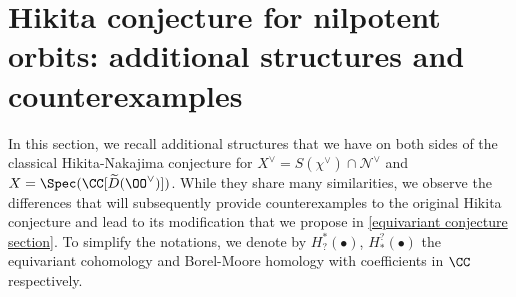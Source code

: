 \documentclass[12pt]{amsart}
\begin{document}
 

\section{Hikita conjecture for nilpotent orbits: additional structures and counterexamples}\label{sect_counter}

In this section, we recall additional structures that we have on both sides of the classical Hikita-Nakajima conjecture for $X^\vee=S(\chi^\vee) \cap \mathcal{N}^\vee$ and $X=\Spec(\CC[\widetilde{D}(\OO^\vee)])$. While they share many similarities, we observe the differences that will subsequently provide counterexamples to the original Hikita conjecture and lead to its modification that we propose in \cref{equivariant conjecture section}. To simplify the notations, we denote by $H^*_{?}(\bullet)$, $H_*^{?}(\bullet)$ the equivariant cohomology and Borel-Moore homology with coefficients in $\CC$ respectively.
\end{document}
